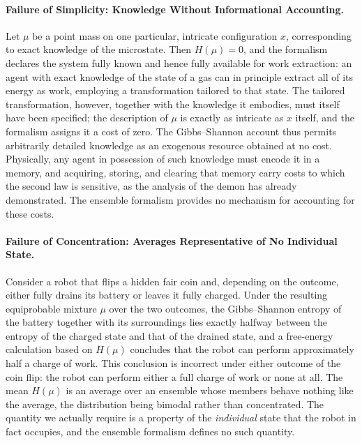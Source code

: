 \documentclass[11pt]{article}
\begin{document}
\paragraph{Failure of Simplicity: Knowledge Without Informational Accounting.} Let $\mu$ be a point mass on one particular, intricate configuration $x$, corresponding to exact knowledge of the microstate. Then $H(\mu) = 0$, and the formalism declares the system fully known and hence fully available for work extraction: an agent with exact knowledge of the state of a gas can in principle extract all of its energy as work, employing a transformation tailored to that state. The tailored transformation, however, together with the knowledge it embodies, must itself have been specified; the description of $\mu$ is exactly as intricate as $x$ itself, and the formalism assigns it a cost of zero. The Gibbs--Shannon account thus permits arbitrarily detailed knowledge as an exogenous resource obtained at no cost. Physically, any agent in possession of such knowledge must encode it in a memory, and acquiring, storing, and clearing that memory carry costs to which the second law is sensitive, as the analysis of the demon has already demonstrated. The ensemble formalism provides no mechanism for accounting for these costs.

\paragraph{Failure of Concentration: Averages Representative of No Individual State.} Consider a robot that flips a hidden fair coin and, depending on the outcome, either fully drains its battery or leaves it fully charged. Under the resulting equiprobable mixture $\mu$ over the two outcomes, the Gibbs--Shannon entropy of the battery together with its surroundings lies exactly halfway between the entropy of the charged state and that of the drained state, and a free-energy calculation based on $H(\mu)$ concludes that the robot can perform approximately half a charge of work. This conclusion is incorrect under either outcome of the coin flip: the robot can perform either a full charge of work or none at all. The mean $H(\mu)$ is an average over an ensemble whose members behave nothing like the average, the distribution being bimodal rather than concentrated. The quantity we actually require is a property of the \emph{individual} state that the robot in fact occupies, and the ensemble formalism defines no such quantity.
\end{document}
